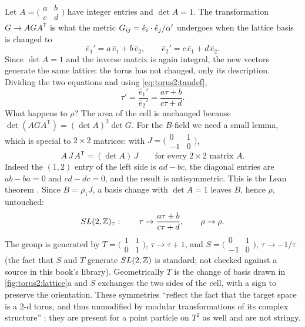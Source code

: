 Let $A=\big(\begin{smallmatrix}a&b\\c&d\end{smallmatrix}\big)$ have integer entries and
$\det A=1$. The transformation $G\to AGA^{\mathsf T}$ is what the metric
$G_{ij}=\hat e_i\cdot\hat e_j/\alpha'$ undergoes when the lattice basis is changed to
\begin{equation}\label{eq:torus2:basis}
 \hat e_1'=a\,\hat e_1+b\,\hat e_2,\qquad \hat e_2'=c\,\hat e_1+d\,\hat e_2 .
\end{equation}
Since $\det A=1$ and the inverse matrix is again integral, the new vectors generate the
same lattice: the torus has not changed, only its description. Dividing the two equations
and using \eqref{eq:torus2:taudef},
\begin{equation}\label{eq:torus2:mobius}
 \tau'=\frac{\hat e_1'}{\hat e_2'}=\frac{a\tau+b}{c\tau+d} .
\end{equation}
What happens to $\rho$? The area of the cell is unchanged because $\det(AGA^{\mathsf T})=
(\det A)^2\det G$. For the $B$-field we need a small lemma, which is special to $2\times2$
matrices: with $J=\big(\begin{smallmatrix}0&1\\-1&0\end{smallmatrix}\big)$,
\begin{equation}\label{eq:torus2:AJAT}
 A\,J\,A^{\mathsf T}=(\det A)\,J\qquad\text{for every }2\times2\text{ matrix }A .
\end{equation}
Indeed the $(1,2)$ entry of the left side is $ad-bc$, the diagonal entries are $ab-ba=0$ and
$cd-dc=0$, and the result is antisymmetric. This is the Lean theorem
 \TA. Since $B=\rho_1J$, a basis change with $\det A=1$ leaves
$B$, hence $\rho$, untouched:
\begin{equation}\label{eq:torus2:SLtau}
 SL(2,\mathbb{Z})_\tau:\qquad \tau\to\frac{a\tau+b}{c\tau+d},\qquad\rho\to\rho .
\end{equation}
The group is generated by
$T=\big(\begin{smallmatrix}1&1\\0&1\end{smallmatrix}\big)$, $\tau\to\tau+1$, and
$S=\big(\begin{smallmatrix}0&1\\-1&0\end{smallmatrix}\big)$, $\tau\to-1/\tau$ (the fact that
$S$ and $T$ generate $SL(2,\mathbb{Z})$ is standard; not checked against a source in this book's
library). Geometrically $T$ is the change of basis drawn in \cref{fig:torus2:lattice}a and
$S$ exchanges the two sides of the cell, with a sign to preserve the orientation. These
symmetries ``reflect the fact that the target space is a 2-d torus, and thus unmodified by
modular transformations of its complex structure'' : they
are present for a point particle on $T^2$ as well and are not stringy.

